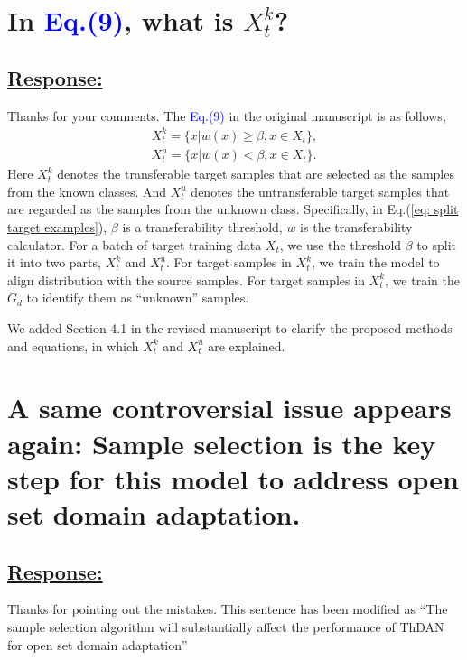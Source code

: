 {\section{In \textcolor{blue}{Eq.(9)}, what is  $X_t^k$?}
\subsection*{\underline{\textbf{Response:}}}

Thanks for your comments.
The \textcolor{blue}{Eq.(9)} in the original manuscript is as follows,
\begin{equation}
    \label{eq: split target examples}
    \begin{split}
        X_t^k=\{x|w(x) \geq \beta, x \in X_t \}, \\
        X_t^u=\{x|w(x) < \beta, x \in X_t \}.
    \end{split}
\end{equation}
Here $X_t^k$ denotes the transferable target samples that are selected as the samples from the known classes.
And $X_t^u$ denotes the untransferable target samples that are regarded as the samples from the unknown class.
Specifically, in Eq.(\ref{eq: split target examples}), $\beta$ is a transferability threshold, $w$ is the transferability calculator.
For a batch of target training data $X_t$, we use the threshold $\beta$ to split it into two parts, $X_t^k$ and $X_t^u$.
For target samples in $X_t^k$, we train the model to align distribution with the source samples.
For target samples in $X_t^k$, we train the $G_d$ to identify them as ``unknown'' samples.

We added Section 4.1 in the revised manuscript to clarify the proposed methods and equations, in which $X_t^k$ and $X_t^u$ are explained.

\section{A same controversial issue appears again: Sample selection is the key step for this model to address open set domain adaptation.}
\subsection*{\underline{\textbf{Response:}}}

Thanks for pointing out the mistakes.
This sentence has been modified as ``The sample selection algorithm will substantially affect the performance of ThDAN for open set domain adaptation'' 

}
